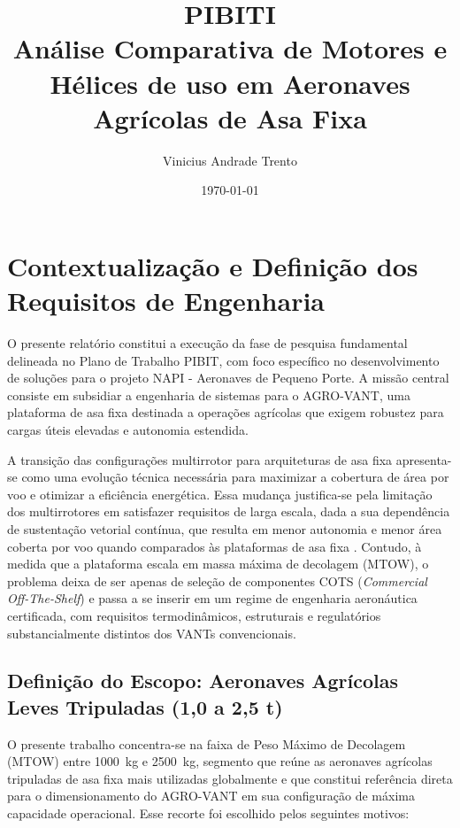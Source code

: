 \documentclass[a4paper,12pt]{article}
\title{\textbf{PIBITI}\\[0.3em]Análise Comparativa de Motores e Hélices de uso em Aeronaves Agrícolas de Asa Fixa}
\author{Vinicius Andrade Trento}
\date{\today}
\begin{document}
\maketitle
\newpage
\tableofcontents
\newpage


\section{Contextualização e Definição dos Requisitos de Engenharia}

O presente relatório constitui a execução da fase de pesquisa fundamental delineada no Plano de Trabalho PIBIT, com foco específico no desenvolvimento de soluções para o projeto NAPI - Aeronaves de Pequeno Porte. A missão central consiste em subsidiar a engenharia de sistemas para o AGRO-VANT, uma plataforma de asa fixa destinada a operações agrícolas que exigem robustez para cargas úteis elevadas e autonomia estendida.

A transição das configurações multirrotor para arquiteturas de asa fixa apresenta-se como uma evolução técnica necessária para maximizar a cobertura de área por voo e otimizar a eficiência energética. Essa mudança justifica-se pela limitação dos multirrotores em satisfazer requisitos de larga escala, dada a sua dependência de sustentação vetorial contínua, que resulta em menor autonomia e menor área coberta por voo quando comparados às plataformas de asa fixa \cite{kartal2025}. Contudo, à medida que a plataforma escala em massa máxima de decolagem (MTOW), o problema deixa de ser apenas de seleção de componentes COTS (\textit{Commercial Off-The-Shelf}) e passa a se inserir em um regime de engenharia aeronáutica certificada, com requisitos termodinâmicos, estruturais e regulatórios substancialmente distintos dos VANTs convencionais.

\subsection{Definição do Escopo: Aeronaves Agrícolas Leves Tripuladas (1{,}0 a 2{,}5 t)}

O presente trabalho concentra-se na faixa de Peso Máximo de Decolagem (MTOW) entre \SI{1000}{kg} e \SI{2500}{kg}, segmento que reúne as aeronaves agrícolas tripuladas de asa fixa mais utilizadas globalmente e que constitui referência direta para o dimensionamento do AGRO-VANT em sua configuração de máxima capacidade operacional. Esse recorte foi escolhido pelos seguintes motivos:
\end{document}

